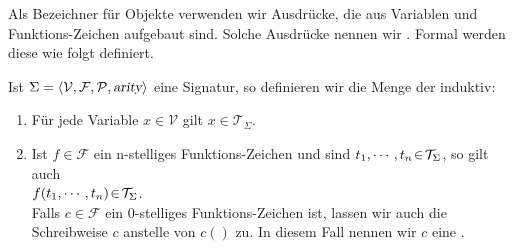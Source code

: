 \noindent
Als Bezeichner für Objekte verwenden wir Ausdrücke, die aus Variablen und
Funktions-Zeichen aufgebaut sind.  Solche Ausdrücke nennen wir .  
Formal werden diese wie folgt definiert.
\begin{Definition}
  Ist $\Sigma = \langle \mathcal{V}, \mathcal{F}, \mathcal{P}, \textsl{arity} \rangle$ eine Signatur, so definieren wir die Menge der 
   induktiv:
  \begin{enumerate}
  \item Für jede Variable $x \in \mathcal{V}$ gilt $x \in \mathcal{T}_\Sigma$.
  \item Ist $f \in \mathcal{F}$ ein n-stelliges Funktions-Zeichen und sind 
        $t_1,\cdots,t_n \!\in\! \mathcal{T}_\Sigma$, so gilt auch \\[0.2cm]
        \hspace*{1.3cm} $f(t_1,\cdots,t_n) \!\in\! \mathcal{T}_\Sigma$. \\[0.2cm]
        Falls $c \in \mathcal{F}$ ein 0-stelliges Funktions-Zeichen ist, lassen wir auch die Schreibweise
        $c$ anstelle von $c()$ zu.  In diesem Fall nennen wir $c$ eine .
        \eox
  \end{enumerate}
\end{Definition}

